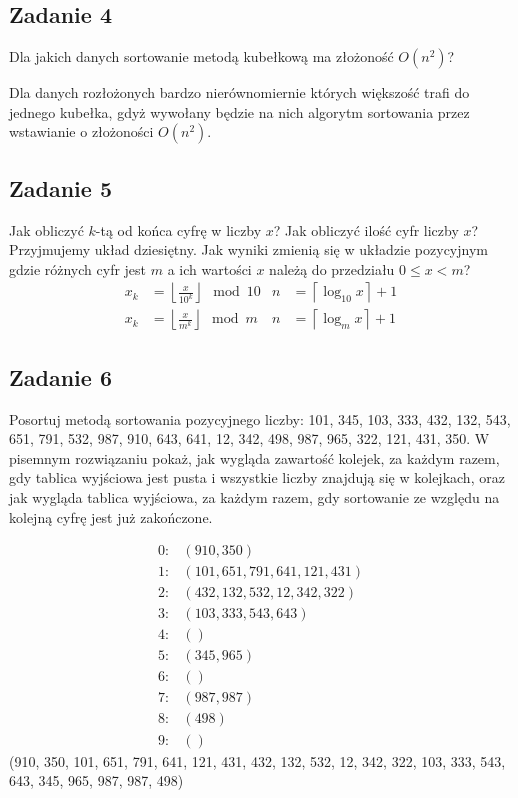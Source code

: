 \documentclass{article}
\begin{document}
\subsection*{Zadanie 4}
Dla jakich danych sortowanie metodą kubełkową ma złożoność $O(n^2)$?
\begin{center}
    Dla danych rozłożonych bardzo nierównomiernie których większość trafi do jednego kubełka, gdyż wywołany będzie na nich
    algorytm sortowania przez wstawianie o złożoności $O(n^2)$.
\end{center}

\subsection*{Zadanie 5}
Jak obliczyć $k$-tą od końca cyfrę w liczby $x$? Jak obliczyć ilość cyfr liczby $x$? Przyjmujemy
układ dziesiętny. Jak wyniki zmienią się w układzie pozycyjnym gdzie różnych cyfr jest $m$ a ich
wartości $x$ należą do przedziału $0 \leq x < m$?
\begin{align*}
    x_k & = \left \lfloor \frac{x}{10^k} \right \rfloor \mod 10 & n & = \left \lceil \log_{10} x \right \rceil + 1 \\
    x_k & = \left \lfloor \frac{x}{m^k} \right \rfloor \mod m   & n & = \left \lceil \log_m x \right \rceil + 1
\end{align*}

\pagebreak
\subsection*{Zadanie 6}
Posortuj metodą sortowania pozycyjnego liczby: 101, 345, 103, 333, 432, 132, 543, 651,
791, 532, 987, 910, 643, 641, 12, 342, 498, 987, 965, 322, 121, 431, 350. W pisemnym
rozwiązaniu pokaż, jak wygląda zawartość kolejek, za każdym razem, gdy tablica
wyjściowa jest pusta i wszystkie liczby znajdują się w kolejkach, oraz jak wygląda
tablica wyjściowa, za każdym razem, gdy sortowanie ze względu na kolejną cyfrę jest już zakończone.

\begin{align*}
    0: & \left(910, 350\right)                     \\
    1: & \left(101, 651, 791, 641, 121, 431\right) \\
    2: & \left(432, 132, 532, 12, 342, 322\right)  \\
    3: & \left(103, 333, 543, 643\right)           \\
    4: & \left(\right)                             \\
    5: & \left(345, 965\right)                     \\
    6: & \left(\right)                             \\
    7: & \left(987, 987\right)                     \\
    8: & \left(498\right)                          \\
    9: & \left(\right)
\end{align*}
(910, 350, 101, 651, 791, 641, 121, 431, 432, 132, 532, 12, 342, 322, 103, 333, 543, 643, 345, 965, 987, 987, 498)
\end{document}
